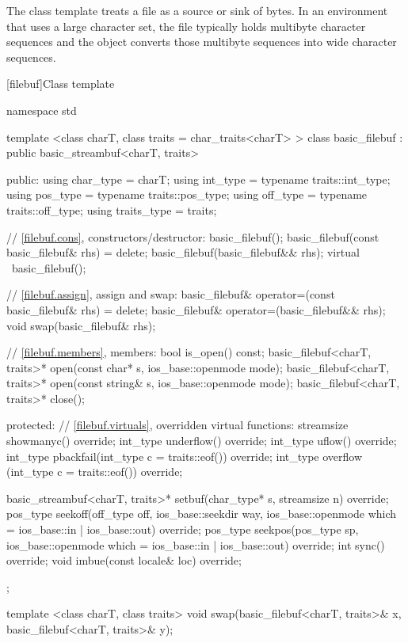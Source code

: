 \pnum
\enternote The class template  treats a file as a source or
sink of bytes. In an environment that uses a large character set, the file
typically holds multibyte character sequences and the 
object converts those multibyte sequences into wide character sequences.
\exitnote

[filebuf]{Class template }

%
\begin{codeblock}
namespace std {
  template <class charT, class traits = char_traits<charT> >
  class basic_filebuf
    : public basic_streambuf<charT, traits> {
  public:
    using char_type   = charT;
    using int_type    = typename traits::int_type;
    using pos_type    = typename traits::pos_type;
    using off_type    = typename traits::off_type;
    using traits_type = traits;

    // \ref{filebuf.cons}, constructors/destructor:
    basic_filebuf();
    basic_filebuf(const basic_filebuf& rhs) = delete;
    basic_filebuf(basic_filebuf&& rhs);
    virtual ~basic_filebuf();

    // \ref{filebuf.assign}, assign and swap:
    basic_filebuf& operator=(const basic_filebuf& rhs) = delete;
    basic_filebuf& operator=(basic_filebuf&& rhs);
    void swap(basic_filebuf& rhs);

    // \ref{filebuf.members}, members:
    bool is_open() const;
    basic_filebuf<charT, traits>* open(const char* s,
                                       ios_base::openmode mode);
    basic_filebuf<charT, traits>* open(const string& s,
                                       ios_base::openmode mode);
    basic_filebuf<charT, traits>* close();

  protected:
    // \ref{filebuf.virtuals}, overridden virtual functions:
    streamsize showmanyc() override;
    int_type underflow() override;
    int_type uflow() override;
    int_type pbackfail(int_type c = traits::eof()) override;
    int_type overflow (int_type c = traits::eof()) override;

    basic_streambuf<charT, traits>* setbuf(char_type* s,
                                           streamsize n) override;
    pos_type seekoff(off_type off, ios_base::seekdir way,
                     ios_base::openmode which
                      = ios_base::in | ios_base::out) override;
    pos_type seekpos(pos_type sp,
                     ios_base::openmode which
                      = ios_base::in | ios_base::out) override;
    int      sync() override;
    void     imbue(const locale& loc) override;
  };

  template <class charT, class traits>
    void swap(basic_filebuf<charT, traits>& x,
              basic_filebuf<charT, traits>& y);
}
\end{codeblock}

